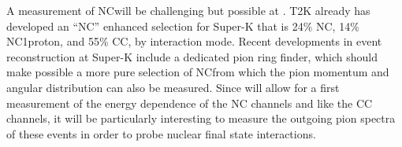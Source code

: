 A measurement of NC\pip will be challenging but possible at \nuprismlite. T2K already has developed an ``NC'' enhanced selection for Super-K that is 24\% NC\pip, 14\% NC1proton, and 55\% CC\numu, by interaction mode. Recent developments in event reconstruction at Super-K include a dedicated pion ring finder, which should make possible a more pure selection of NC\pip from which the pion momentum and angular distribution can also be measured. Since \nuprismlite will allow for a first measurement of the energy dependence of the NC channels and like the CC channels, it will be particularly interesting to measure the outgoing pion spectra of these events in order to probe nuclear final state interactions.




